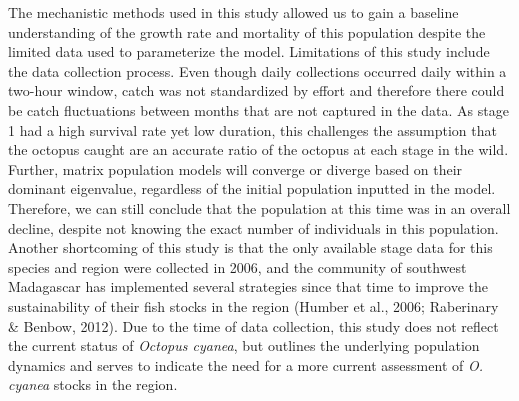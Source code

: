 \documentclass[
]{article}
\begin{document}
The mechanistic methods used in this study allowed us to gain a baseline understanding of the growth rate and mortality of this population despite the limited data used to parameterize the model. Limitations of this study include the data collection process. Even though daily collections occurred daily within a two-hour window, catch was not standardized by effort and therefore there could be catch fluctuations between months that are not captured in the data. As stage 1 had a high survival rate yet low duration, this challenges the assumption that the octopus caught are an accurate ratio of the octopus at each stage in the wild. Further, matrix population models will converge or diverge based on their dominant eigenvalue, regardless of the initial population inputted in the model. Therefore, we can still conclude that the population at this time was in an overall decline, despite not knowing the exact number of individuals in this population. Another shortcoming of this study is that the only available stage data for this species and region were collected in 2006, and the community of southwest Madagascar has implemented several strategies since that time to improve the sustainability of their fish stocks in the region (Humber et al., 2006; Raberinary \& Benbow, 2012). Due to the time of data collection, this study does not reflect the current status of \emph{Octopus cyanea}, but outlines the underlying population dynamics and serves to indicate the need for a more current assessment of \emph{O. cyanea} stocks in the region.
\end{document}
